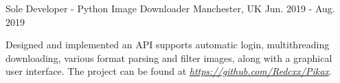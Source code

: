 \begin{cventries}
  \cventry
    {Sole Developer - Python} %
    {Image Downloader} %
    {Manchester, UK} %
    {Jun. 2019 - Aug. 2019} %
    {
      \begin{cvitems} %
        \item {Designed and implemented an API supports automatic login, multithreading downloading, various format parsing and filter images, along with a graphical user interface. The project can be found at \href{https://github.com/Redcxx/Pikax}{\textit{https://github.com/Redcxx/Pikax}}.}
      \end{cvitems}
    }
  
    






\end{cventries}
